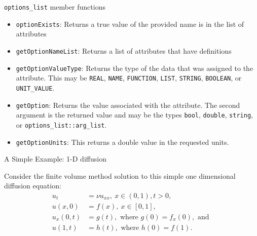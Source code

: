 \documentclass{beamer}
\begin{document}
\begin{frame}{{\tt options\_list} member functions}
\begin{itemize}
\item {\tt optionExists}: Returns a true value of the provided name is in the list of attributes
\item{\tt getOptionNameList}: Returns a list of attributes that have definitions
\item{\tt getOptionValueType}: Returns the type of the data that was assigned to the attribute.  This may be {\tt REAL}, {\tt NAME}, {\tt FUNCTION}, {\tt LIST}, {\tt STRING}, {\tt BOOLEAN}, or {\tt UNIT\_VALUE}.

\item {\tt getOption}: Returns the value associated with the attribute.  The second argument is the returned value and may be the types {\tt bool}, {\tt double}, {\tt string}, or {\tt options\_list::arg\_list}.

\item {\tt getOptionUnits}: This returns a double value in the requested units.
\end{itemize}
\end{frame}

\begin{frame}{A Simple Example: 1-D diffusion}

  Consider the finite volume method solution to this simple one
  dimensional diffusion equation:
\begin{align*}
u_t      & =  \nu u_{xx},~ x \in (0,1), t>0,\\
u(x,0)   & =  f(x),~ x \in [0,1],\\
u_x(0,t) & =  g(t), \mbox{ where } g(0) = f_x(0), \mbox{ and }\\
u(1,t) & =  h(t), \mbox{ where } h(0) = f(1).
\end{align*}

\end{frame}
\end{document}
